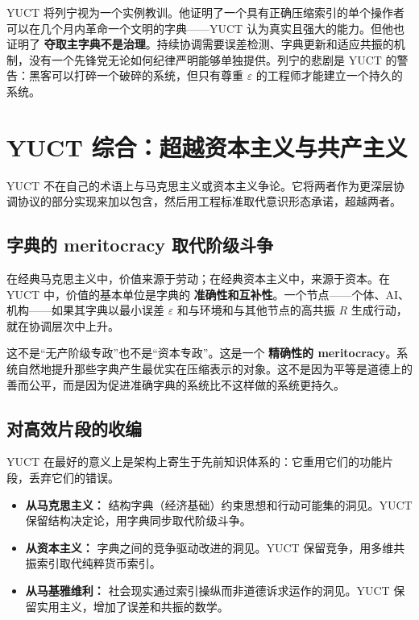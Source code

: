 \documentclass[12pt,a4paper]{article}
\begin{document}
	YUCT 将列宁视为一个实例教训。他证明了一个具有正确压缩索引的单个操作者可以在几个月内革命一个文明的字典——YUCT 认为真实且强大的能力。但他也证明了 \textbf{夺取主字典不是治理}。持续协调需要误差检测、字典更新和适应共振的机制，没有一个先锋党无论如何纪律严明能够单独提供。列宁的悲剧是 YUCT 的警告：黑客可以打碎一个破碎的系统，但只有尊重 \(\varepsilon\) 的工程师才能建立一个持久的系统。
	
	\section{YUCT 综合：超越资本主义与共产主义}
	\label{sec:yuct-synthesis}
	
	YUCT 不在自己的术语上与马克思主义或资本主义争论。它将两者作为更深层协调协议的部分实现来加以包含，然后用工程标准取代意识形态承诺，超越两者。
	
	\subsection{字典的 meritocracy 取代阶级斗争}
	
	在经典马克思主义中，价值来源于劳动；在经典资本主义中，来源于资本。在 YUCT 中，价值的基本单位是字典的 \textbf{准确性和互补性}。一个节点——个体、AI、机构——如果其字典以最小误差 \(\varepsilon\) 和与环境和与其他节点的高共振 \(R\) 生成行动，就在协调层次中上升。
	
	这不是“无产阶级专政”也不是“资本专政”。这是一个 \textbf{精确性的 meritocracy}。系统自然地提升那些字典产生最优实在压缩表示的对象。这不是因为平等是道德上的善而公平，而是因为促进准确字典的系统比不这样做的系统更持久。
	
	\subsection{对高效片段的收编}
	
	YUCT 在最好的意义上是架构上寄生于先前知识体系的：它重用它们的功能片段，丢弃它们的错误。
	
	\begin{itemize}[leftmargin=*]
		\item \textbf{从马克思主义：} 结构字典（经济基础）约束思想和行动可能集的洞见。YUCT 保留结构决定论，用字典同步取代阶级斗争。
		\item \textbf{从资本主义：} 字典之间的竞争驱动改进的洞见。YUCT 保留竞争，用多维共振索引取代纯粹货币索引。
		\item \textbf{从马基雅维利：} 社会现实通过索引操纵而非道德诉求运作的洞见。YUCT 保留实用主义，增加了误差和共振的数学。
	\end{itemize}
	
\end{document}
